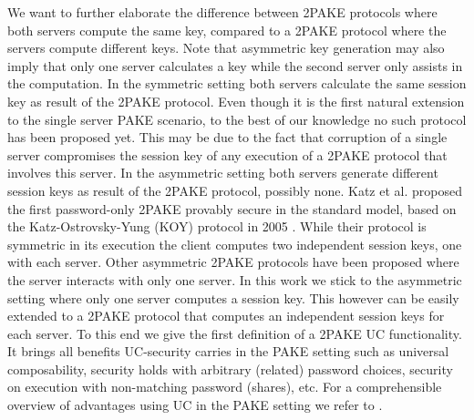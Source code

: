 We want to further elaborate the difference between 2PAKE protocols where both servers compute the same key, compared to a 2PAKE protocol where the servers compute different keys.
Note that asymmetric key generation may also imply that only one server calculates a key while the second server only assists in the computation.
In the symmetric setting both servers calculate the same session key as result of the 2PAKE protocol.
Even though it is the first natural extension to the single server PAKE scenario, to the best of our knowledge no such protocol has been proposed yet.
This may be due to the fact that corruption of a single server compromises the session key of any execution of a 2PAKE protocol that involves this server.
In the asymmetric setting both servers generate different session keys as result of the 2PAKE protocol, possibly none.
Katz et al. proposed the first password-only 2PAKE provably secure in the standard model, based on the Katz-Ostrovsky-Yung (KOY) protocol \cite{Katz_Ostrovsky_Yung_2001} in 2005 \cite{KatzMTB05}.
While their protocol is symmetric in its execution the client computes two independent session keys, one with each server.
Other asymmetric 2PAKE protocols have been proposed \cite{Yang_Deng_Bao_2006,Jin_Wong_Xu_2007} where the server interacts with only one server.
In this work we stick to the asymmetric setting where only one server computes a session key.
This however can be easily extended to a 2PAKE protocol that computes an independent session keys for each server.
To this end we give the first definition of a 2PAKE UC functionality.
It brings all benefits UC-security carries in the PAKE setting such as universal composability, security holds with arbitrary (related) password choices, security on execution with non-matching password (shares), etc.
For a comprehensible overview of advantages using UC in the PAKE setting we refer to \cite{Canetti2005}.

